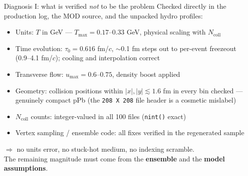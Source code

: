 \documentclass[aspectratio=169]{beamer}
\newcommand{\good}[1]{{\color{green!50!black}#1}}
\begin{document}
\begin{frame}[t]{Diagnosis I: what is verified \emph{not} to be the problem}
  Checked directly in the production log, the MOD source, and the unpacked hydro profiles:
  \vspace{0.4em}
  \begin{itemize}
    \item \good{Units}: $T$ in GeV --- $T_\mathrm{max} = 0.17$--$0.33$ GeV, physical scaling with $N_\mathrm{coll}$
    \item \good{Time evolution}: $\tau_0 = 0.616$ fm/$c$, $\sim$0.1 fm steps out to per-event freezeout (0.9--4.1 fm/$c$); cooling and interpolation correct
    \item \good{Transverse flow}: $u_\mathrm{max} = 0.6$--$0.75$, density boost applied
    \item \good{Geometry}: collision positions within $|x|,|y| \lesssim 1.6$ fm in every bin checked --- genuinely compact pPb (the \texttt{208 X 208} file header is a cosmetic mislabel)
    \item \good{$N_\mathrm{coll}$ counts}: integer-valued in all 100 files (\texttt{nint()} exact)
    \item \good{Vertex sampling / ensemble code}: all fixes verified in the regenerated sample
  \end{itemize}
  \vspace{0.5em}
  $\Rightarrow$ no units error, no stuck-hot medium, no indexing scramble.\\
  The remaining magnitude must come from the \textbf{ensemble} and the \textbf{model assumptions}.
\end{frame}
\end{document}
